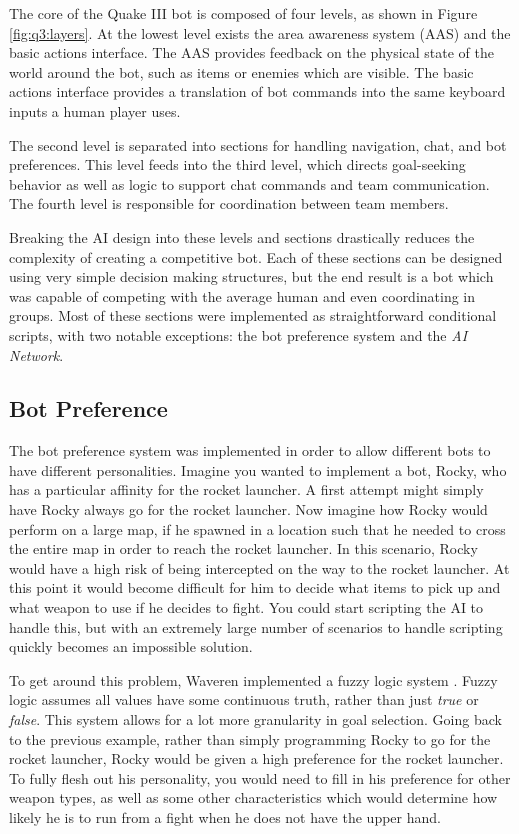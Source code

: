 The core of the Quake III bot is composed of four levels, as shown in Figure \ref{fig:q3:layers}. At the lowest level exists the area awareness system (AAS) and the basic actions interface. The AAS provides feedback on the physical state of the world around the bot, such as items or enemies which are visible. The basic actions interface provides a translation of bot commands into the same keyboard inputs a human player uses.

The second level is separated into sections for handling navigation, chat, and bot preferences. This level feeds into the third level, which directs goal-seeking behavior as well as logic to support chat commands and team communication. The fourth level is responsible for coordination between team members.

Breaking the AI design into these levels and sections drastically reduces the complexity of creating a competitive bot. Each of these sections can be designed using very simple decision making structures, but the end result is a bot which was capable of competing with the average human and even coordinating in groups. Most of these sections were implemented as straightforward conditional scripts, with two notable exceptions: the bot preference system and the \emph{AI Network}.

\subsection{Bot Preference}

The bot preference system was implemented in order to allow different bots to have different personalities. Imagine you wanted to implement a bot, Rocky, who has a particular affinity for the rocket launcher. A first attempt might simply have Rocky always go for the rocket launcher. Now imagine how Rocky would perform on a large map, if he spawned in a location such that he needed to cross the entire map in order to reach the rocket launcher. In this scenario, Rocky would have a high risk of being intercepted on the way to the rocket launcher. At this point it would become difficult for him to decide what items to pick up and what weapon to use if he decides to fight. You could start scripting the AI to handle this, but with an extremely large number of scenarios to handle scripting quickly becomes an impossible solution.

To get around this problem, Waveren implemented a fuzzy logic system \cite{q3bot}. Fuzzy logic assumes all values have some continuous truth, rather than just \emph{true} or \emph{false}. This system allows for a lot more granularity in goal selection. Going back to the previous example, rather than simply programming Rocky to go for the rocket launcher, Rocky would be given a high preference for the rocket launcher. To fully flesh out his personality, you would need to fill in his preference for other weapon types, as well as some other characteristics which would determine how likely he is to run from a fight when he does not have the upper hand.

